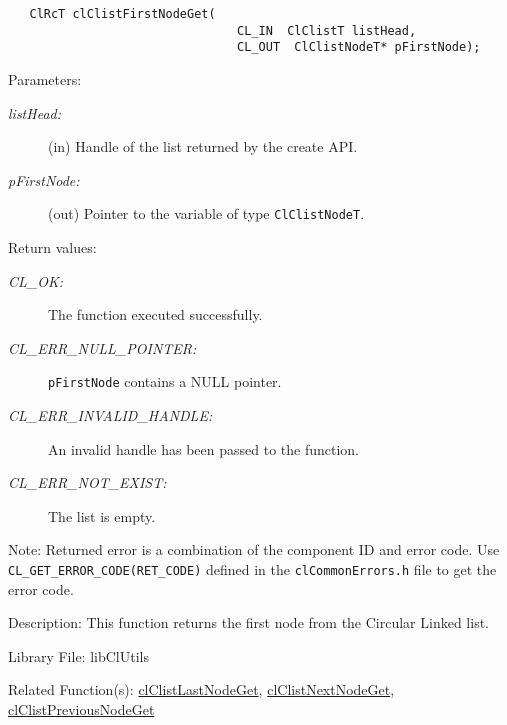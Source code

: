 \begin{flushleft}
\begin{Desc}
\footnotesize\begin{verbatim}   ClRcT clClistFirstNodeGet(
                           		CL_IN  ClClistT listHead,
                           		CL_OUT  ClClistNodeT* pFirstNode);
\end{verbatim}
\normalsize
\end{Desc}
\begin{Desc}
\item[Parameters:]
\begin{description}
\item[{\em list\-Head:}](in) Handle of the list returned by the create API. 
\item[{\em p\-First\-Node:}](out) Pointer to the variable of type {\tt{Cl\-Clist\-Node\-T}}.\end{description}
\end{Desc}
\begin{Desc}
\item[Return values:]
\begin{description}
\item[{\em CL\_\-OK:}]The function executed successfully. 
\item[{\em CL\_\-ERR\_\-NULL\_\-POINTER:}]{\tt{pFirstNode}} contains a NULL pointer. 
\item[{\em CL\_\-ERR\_\-INVALID\_\-HANDLE:}]An invalid handle has been passed to the function. 
\item[{\em CL\_\-ERR\_\-NOT\_\-EXIST:}]The list is empty.\end{description}
\end{Desc}
\begin{Desc}
\item[Note:]Returned error is a combination of the component ID and error code. Use {\tt{CL\_\-GET\_\-ERROR\_\-CODE(RET\_\-CODE)}} defined in 
the {\tt{clCommonErrors.h}} file to get the error code.\end{Desc}
\begin{Desc}
\item[Description:]This function returns the first node from the Circular Linked list.\end{Desc}
\begin{Desc}
\item[Library File:]lib\-Cl\-Utils\end{Desc}
\begin{Desc}
\item[Related Function(s):]\hyperlink{pagecl108}{cl\-Clist\-Last\-Node\-Get}, \hyperlink{pagecl109}{cl\-Clist\-Next\-Node\-Get}, 
\hyperlink{pagecl110}{cl\-Clist\-Previous\-Node\-Get} \end{Desc}
\newpage


\end{flushleft}
